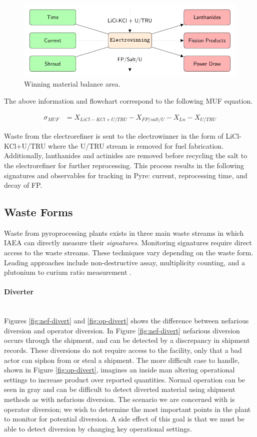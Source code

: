 \begin{figure}[h] 
	\centering
	\includegraphics[width=0.8\linewidth]{images/winning}
	\caption{Winning material balance area.}
	\label{fig:winning}
\end{figure}

The above information and flowchart correspond to the following MUF equation.

\begin{align}
\sigma_{MUF} &= X_{LiCl-KCl + U/TRU} - X_{FP/salt/U} - X_{Ln} - X_{U/TRU}
\end{align}

Waste from the electrorefiner is sent to the electrowinner in the form of LiCl-KCl+U/TRU where the U/TRU stream is removed for fuel fabrication. Additionally, lanthanides and actinides are removed before recycling the salt to the electrorefiner for further reprocessing. This process results in the following signatures and observables for tracking in Pyre: current, reprocessing time, and decay of FP. 

\subsection{Waste Forms}

Waste from pyroprocessing plants exists in three main waste streams in which IAEA can directly measure their \emph{signatures}. Monitoring signatures require direct access to the waste streams.
These techniques vary depending on the waste form. Leading approaches include non-destructive assay, multiplicity counting, and a plutonium to curium ratio measurement \cite{lee_determination_2012,noauthor_non-destructive_nodate}.

\paragraph{Diverter} \mbox{}\\
Figures \ref{fig:nef-divert} and \ref{fig:op-divert} shows the difference between nefarious diversion and operator diversion. In Figure \ref{fig:nef-divert} nefarious diversion occurs
through the shipment, and can be detected by a discrepancy in shipment records. These diversions do not require access to the facility, only that a bad actor can siphon from or steal a shipment. The more difficult case to handle, shown in Figure \ref{fig:op-divert}, imagines an inside man altering operational settings
to increase product over reported quantities. Normal operation can be seen in gray and can be difficult to detect diverted material using shipment methods as with nefarious diversion. The scenario we are concerned with is operator diversion; we wish to determine the most important points in the plant to monitor for potential
diversion. A side effect of this goal is that we must be able to detect diversion by changing key operational settings.

